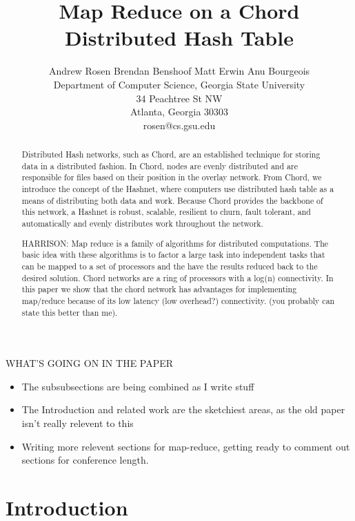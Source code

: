 \documentclass[conference, compsocconf, letterpaper]{IEEEtran}
\title{Map Reduce on a Chord Distributed Hash Table}
\author{
Andrew Rosen \qquad Brendan Benshoof \qquad Matt Erwin \qquad Anu Bourgeois  \\Department of Computer Science, Georgia State University\\ 34 Peachtree St NW \\ Atlanta, Georgia 30303\\  rosen@cs.gsu.edu }
\begin{document}
\maketitle

\begin{abstract}
Distributed Hash networks, such as Chord, are an established technique for storing data in a distributed fashion. In Chord, nodes are evenly distributed and are responsible for files based on their position in the overlay network.  From Chord, we introduce the concept of the Hashnet, where computers use distributed hash table as a means of distributing both data and work.  Because Chord provides the backbone of this network, a Hashnet is robust, scalable, resilient to churn, fault tolerant, and automatically  and evenly distributes work throughout the network.

HARRISON:  Map reduce is a family of algorithms for distributed computations. The basic idea with these algorithms is to factor a large task into independent tasks that can be mapped to a set of processors and the have the results reduced back to the desired solution. Chord networks are a ring of processors with a log(n) connectivity.  In this paper we show that the chord network has advantages for implementing map/reduce because of its low latency (low overhead?) connectivity. (you probably can state this better than me).

\end{abstract}

WHAT'S GOING ON IN THE PAPER

\begin{itemize}
    \item The subsubsections are being combined as I write stuff
    \item The Introduction and related work are the sketchiest areas, as the old paper isn't really relevent to this 
    \item Writing more relevent sections for map-reduce, getting ready to comment out sections for conference length.
\end{itemize}


\section{Introduction}
\end{document}

